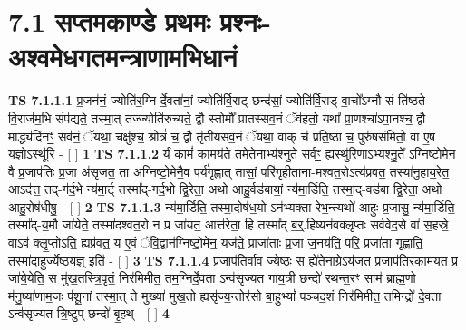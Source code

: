 \documentclass[17pt]{extarticle}
\begin{document}
     \section*{ 7.1      सप्तमकाण्डे प्रथमः प्रश्नः- अश्वमेधगतमन्त्राणामभिधानं }
                                        \textbf{ TS 7.1.1.1} \newline
                  प्र॒जन॑नं॒ ज्योति॑र॒ग्नि-र्दे॒वता॑नां॒ ज्योति॑र्वि॒राट् छन्द॑सां॒ ज्योति॑र्वि॒राड् वा॒चो᳚ऽग्नौ सं ति॑ष्ठते वि॒राज॑म॒भि संप॑द्यते॒ तस्मा॒त् तज्ज्योति॑रुच्यते॒ द्वौ स्तोमौ᳚ प्रातस्सव॒नं ॅव॑हतो॒ यथा᳚ प्रा॒णश्चा॑ऽपा॒नश्च॒ द्वौ माद्ध्य॑दिंनꣳ॒॒ सव॑नं॒ ॅयथा॒ चक्षु॑श्च॒ श्रोत्रं॑ च॒ द्वौ तृ॑तीयसव॒नं ॅयथा॒ वाक् च॑ प्रति॒ष्ठा च॒ पुरु॑षसंमितो॒ वा ए॒ष य॒ज्ञोऽस्थू॑रि॒ - [  ] \textbf{  1} \newline
                  \newline
                                \textbf{ TS 7.1.1.2} \newline
                  र्यं कामं॑ का॒मय॑ते॒ तमे॒तेना॒भ्य॑श्नुते॒ सर्वꣳ॒॒ ह्यस्थु॑रिणाऽभ्यश्नु॒ते᳚ ऽग्निष्टो॒मेन॒ वै प्र॒जाप॑तिः प्र॒जा अ॑सृजत॒ ता अ॑ग्निष्टो॒मेनै॒व पर्य॑गृह्णा॒त् तासां॒ परि॑गृहीताना-मश्वत॒रोऽत्य॑प्रवत॒ तस्या॑नु॒हाय॒रेत॒ आऽद॑त्त॒ तद्-ग॑र्द॒भे न्य॑मा॒र्ट् तस्मा᳚द्-गर्द॒भो द्वि॒रेता॒ अथो॑ आहु॒र्वड॑बायां॒ न्य॑मा॒र्डिति॒ तस्मा॒द्-वड॑बा द्वि॒रेता॒ अथो॑ आहु॒रोष॑धीषु॒ - [  ] \textbf{  2} \newline
                  \newline
                                \textbf{ TS 7.1.1.3} \newline
                  न्य॑मा॒र्डिति॒ तस्मा॒दोष॑ध॒यो ऽन॑भ्यक्ता रेभ॒न्त्यथो॑ आहुः प्र॒जासु॒ न्य॑मा॒र्डिति॒ तस्मा᳚द्-य॒मौ जा॑येते॒ तस्मा॑दश्वत॒रो न प्र जा॑यत॒ आत्त॑रेता॒ हि तस्मा᳚द् ब॒र्॒.हिष्यन॑वक्लृप्तः सर्ववेद॒से वा॑ स॒हस्रे॒ वाऽव॑ क्लृ॒प्तोऽति॒ ह्यप्र॑वत॒ य ए॒वं ॅवि॒द्वान॑ग्निष्टो॒मेन॒ यज॑ते॒ प्राजा॑ताः प्र॒जा ज॒नय॑ति॒ परि॒ प्रजा॑ता गृह्णाति॒ तस्मा॑दाहुर्ज्येष्ठय॒ज्ञ् इति॑ - [  ] \textbf{  3} \newline
                  \newline
                                \textbf{ TS 7.1.1.4} \newline
                  प्र॒जाप॑ति॒र्वाव ज्येष्ठः॒ स ह्ये॑तेनाग्रेऽय॑जत प्र॒जाप॑तिरकामयत॒ प्र जा॑ये॒येति॒ स मु॑ख॒तस्त्रि॒वृतं॒ निर॑मिमीत॒ तम॒ग्निर्दे॒वता ऽन्व॑सृज्यत गाय॒त्री छन्दो॑ रथन्त॒रꣳ साम॑ ब्राह्म॒णो म॑नु॒ष्या॑णाम॒जः प॑शू॒नां तस्मा॒त् ते मुख्या॑ मुख॒तो ह्यसृ॑ज्य॒न्तोर॑सो बा॒हुभ्यां᳚ पञ्चद॒शं निर॑मिमीत॒ तमिन्द्रो॑ दे॒वता ऽन्व॑सृज्यत त्रि॒ष्टुप् छन्दो॑ बृ॒हथ् - [  ] \textbf{  4} \newline
\end{document}
